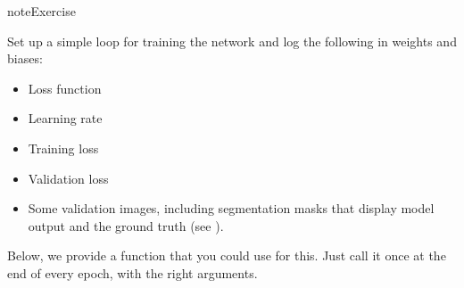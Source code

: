 \documentclass[letterpaper,10pt,english]{jupyterBook}
\begin{document}
\begin{sphinxadmonition}{note}{Exercise}

\sphinxAtStartPar
Set up a simple loop for training the network and log the following in weights and biases:
\begin{itemize}
\item {} 
\sphinxAtStartPar
Loss function

\item {} 
\sphinxAtStartPar
Learning rate

\item {} 
\sphinxAtStartPar
Training loss

\item {} 
\sphinxAtStartPar
Validation loss

\item {} 
\sphinxAtStartPar
Some validation images, including segmentation masks that display model output and the ground truth (see ).

\end{itemize}

\sphinxAtStartPar
Below, we provide a  function that you could use for this. Just call it once at the end of every epoch, with the right arguments.
\end{sphinxadmonition}
\end{document}
